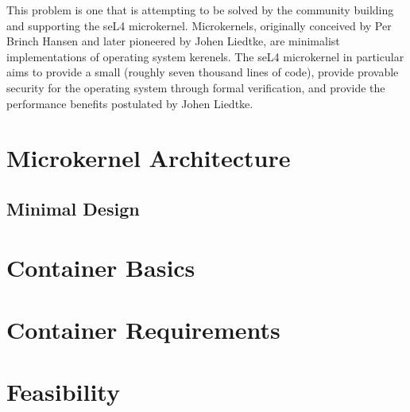 \documentclass[10pt]{article}
\begin{document}
	This problem is one that is attempting to be solved by the community building and supporting the seL4 microkernel.
	Microkernels, originally conceived by Per Brinch Hansen and later pioneered by Johen Liedtke, are minimalist
	implementations of operating system kerenels.\cite{microkernelperformance} The seL4 microkernel in particular aims
	to provide a small (roughly seven thousand lines of code), provide provable security for the operating system
	through formal verification, and provide the performance benefits postulated by Johen Liedtke.\cite{seL4FAQ}

\section*{Microkernel Architecture}
\subsection*{Minimal Design}

\section*{Container Basics}
\section*{Container Requirements}
\section*{Feasibility}



\end{document}
